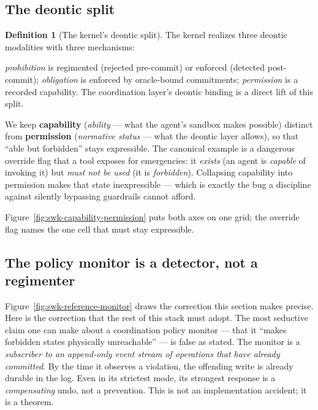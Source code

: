 \documentclass[11pt,a4paper]{article}
\theoremstyle{definition}
\newtheorem{definition}{Definition}[section]
\theoremstyle{remark}
\begin{document}
\subsection{The deontic split}

\begin{definition}[The kernel's deontic split]\label{def:deontic}
\setlength{\parskip}{4pt plus 1pt}
The kernel realizes three deontic modalities with three mechanisms:

\emph{prohibition} is regimented (rejected pre-commit) or enforced (detected
post-commit); \emph{obligation} is enforced by oracle-bound commitments;
\emph{permission} is a recorded capability. The coordination layer's deontic
binding is a direct lift of this split.
\end{definition}

We keep \textbf{capability} (\emph{ability} --- what the agent's sandbox makes
possible) distinct from \textbf{permission} (\emph{normative status} --- what the
deontic layer allows), so that ``able but forbidden'' stays expressible. The
canonical example is a dangerous override flag that a tool exposes for emergencies:
it \emph{exists} (an agent is \emph{capable} of invoking it) but \emph{must not be
used} (it is \emph{forbidden}). Collapsing capability into permission makes that
state inexpressible --- which is exactly the bug a discipline against silently
bypassing guardrails cannot afford.



Figure~\ref{fig:swk-capability-permission} puts both axes on one grid; the
override flag names the one cell that must stay expressible.

\subsection{The policy monitor is a detector, not a regimenter}
\label{sec:arbiter-correction}



Figure~\ref{fig:swk-reference-monitor} draws the correction this section makes
precise. Here is the correction that the rest of this stack must adopt. The most seductive
claim one can make about a coordination policy monitor --- that it ``makes
forbidden states physically unreachable'' --- is false as stated. The monitor is a
\emph{subscriber to an append-only event stream of operations that have already
committed}. By the time it observes a violation, the offending write is already
durable in the log. Even in its strictest mode, its strongest response is a
\emph{compensating} undo, not a prevention. This is not an implementation accident;
it is a theorem.
\end{document}

